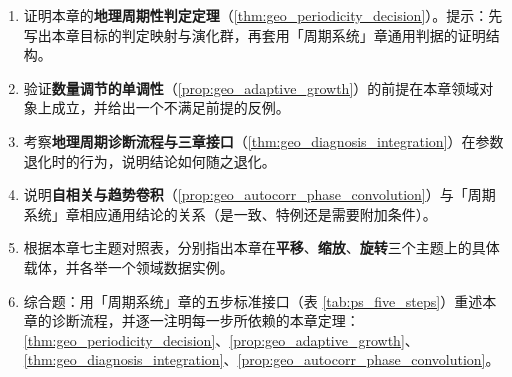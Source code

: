 \begin{enumerate}[leftmargin=3em, label=\textbf{题 \arabic*}]
    \item 证明本章的\textbf{地理周期性判定定理}（\ref{thm:geo_periodicity_decision}）。提示：先写出本章目标的判定映射与演化群，再套用「周期系统」章通用判据的证明结构。

    \item 验证\textbf{数量调节的单调性}（\ref{prop:geo_adaptive_growth}）的前提在本章领域对象上成立，并给出一个不满足前提的反例。

    \item 考察\textbf{地理周期诊断流程与三章接口}（\ref{thm:geo_diagnosis_integration}）在参数退化时的行为，说明结论如何随之退化。

    \item 说明\textbf{自相关与趋势卷积}（\ref{prop:geo_autocorr_phase_convolution}）与「周期系统」章相应通用结论的关系（是一致、特例还是需要附加条件）。

    \item 根据本章七主题对照表，分别指出本章在\textbf{平移}、\textbf{缩放}、\textbf{旋转}三个主题上的具体载体，并各举一个领域数据实例。

    \item 综合题：用「周期系统」章的五步标准接口（表 \ref{tab:ps_five_steps}）重述本章的诊断流程，并逐一注明每一步所依赖的本章定理：\ref{thm:geo_periodicity_decision}、\ref{prop:geo_adaptive_growth}、\ref{thm:geo_diagnosis_integration}、\ref{prop:geo_autocorr_phase_convolution}。
\end{enumerate}


